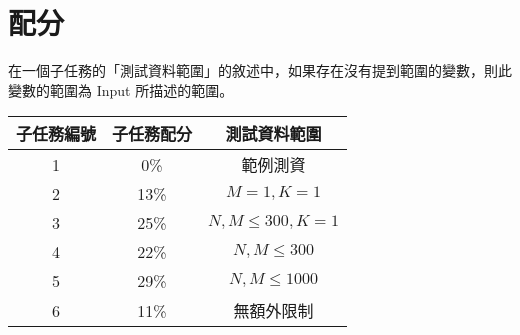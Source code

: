 \documentclass[11pt,a4paper]{article}
\begin{document}
\section*{配分}

在一個子任務的「測試資料範圍」的敘述中，如果存在沒有提到範圍的變數，則此變數的範圍為 Input 所描述的範圍。

\begin{center}
 \begin{tabular}{||c c c||} 
 \hline
 子任務編號 & 子任務配分 & 測試資料範圍 \\  
 \hline
 \hline
 1 & 0\% & 範例測資 \\ 
 \hline
 2 & 13\% & $M =  1 , K = 1 $ \\
 \hline 
 3 & 25\% & $N, M \le  300, K = 1$ \\
 \hline
 4 & 22\% & $N, M \le  300$ \\
 \hline
 5 & 29\% & $N, M \le 1000$ \\
 \hline
 6 & 11\% & 無額外限制 \\
 \hline

\end{tabular}
\end{center}
\end{document}
